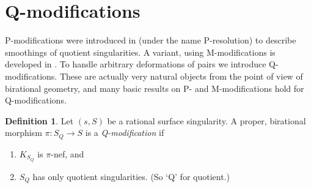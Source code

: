 \documentclass{amsart}
\theoremstyle{definition}
\newtheorem{defn}[thm]{Definition}
\theoremstyle{remark}
\begin{document}
\section{Q-modifications}


P-modifications were introduced in \cite{ksb} (under the name P-resolution) to describe   smoothings of quotient singularities. A variant, using M-modifications is developed in  \cite{be-ch}.  To handle arbitrary deformations of pairs we introduce 
Q-modifications.  These are actually very natural objects from the point of view of birational geometry, and many basic results on P- and M-modifications
hold for Q-modifications. 

\begin{defn}\label{Q-mod.defn}
  Let $(s,S)$ be a rational surface singularity. A proper, birational morphism $\pi:S_Q\to S$ is a {\it Q-modification}
if
\begin{enumerate}
\item $K_{S_Q}$ is $\pi$-nef, and
\item $S_Q$ has only quotient singularities. (So `Q' for quotient.)
\end{enumerate}
\end{defn}
\end{document}
